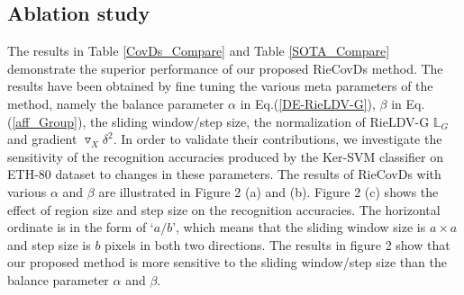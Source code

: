 \documentclass[review]{elsarticle}
\begin{document}
\subsection{Ablation study}
	The results in Table \ref{CovDs_Compare} and Table \ref{SOTA_Compare} demonstrate  the superior performance of our proposed RieCovDs  method. 
	 The results have been obtained by fine tuning the various meta parameters of the method, namely the balance parameter $\alpha$ in Eq.(\ref{DE-RieLDV-G}), $\beta$ in Eq.(\ref{aff_Group}), the sliding window/step size, the normalization of RieLDV-G $\mathbb{L}_G$ and gradient $\triangledown_X\delta^2$. In order to validate their contributions, we investigate the sensitivity of the recognition accuracies produced by the Ker-SVM classifier on ETH-80 dataset \cite{leibe2003analyzing} to changes in these parameters. The results of RieCovDs with various $\alpha$ and $\beta$ are illustrated in Figure 2 (a) and (b). Figure 2 (c) shows the effect of region size and step size on the recognition accuracies. The horizontal ordinate is in the form of `$a/b$', which means that the sliding window size is $a\times a$ and step size is $b$ pixels in both two directions. The results in figure 2 show that our proposed method is more sensitive to the sliding window/step size than the balance parameter $\alpha$ and  $\beta$.
	 
\end{document}

